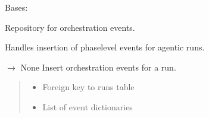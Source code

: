 \documentclass[letterpaper,10pt,english]{sphinxmanual}
\begin{document}
\begin{fulllineitems}
\label{\detokenize{core.database.repositories.events:core.database.repositories.events.EventsRepository}}
\pysigstartsignatures
\pysiglinewithargsret
{}
{}
{}
\pysigstopsignatures
\sphinxAtStartPar
Bases: 

\sphinxAtStartPar
Repository for orchestration events.

\sphinxAtStartPar
Handles insertion of phase\sphinxhyphen{}level events for agentic runs.

\begin{fulllineitems}
\label{\detokenize{core.database.repositories.events:core.database.repositories.events.EventsRepository.insert_events}}
\pysigstartsignatures
\pysiglinewithargsret
{}
{\sphinxparamcomma {}}
{{ $\rightarrow$ None}}
\pysigstopsignatures
\sphinxAtStartPar
Insert orchestration events for a run.
\begin{quote}\begin{description}
\begin{itemize}
\item {} 
\sphinxAtStartPar
{} \textendash{} Foreign key to runs table

\item {} 
\sphinxAtStartPar
{} \textendash{} List of event dictionaries

\end{itemize}

\end{description}\end{quote}

\end{fulllineitems}


\end{fulllineitems}
\end{document}
